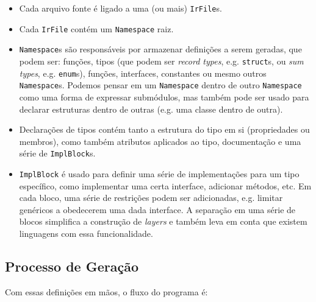 \begin{itemize}
\item Cada arquivo fonte é ligado a uma (ou mais) \texttt{IrFile}s.
\item Cada \texttt{IrFile} contém um \texttt{Namespace} raiz.
\item \texttt{Namespace}s são responsáveis por armazenar definições a serem geradas, que podem ser:
  funções, tipos (que podem ser \textit{record types}, e.g. \texttt{struct}s, ou \textit{sum types},
  e.g. \texttt{enum}s), funções, interfaces, constantes ou mesmo outros \texttt{Namespace}s. Podemos
  pensar em um \texttt{Namespace} dentro de outro \texttt{Namespace} como uma forma de expressar
  submódulos, mas também pode ser usado para declarar estruturas dentro de outras (e.g. uma classe
  dentro de outra).
\item Declarações de tipos contém tanto a estrutura do tipo em si (propriedades ou membros), como
  também atributos aplicados ao tipo, documentação e uma série de \texttt{ImplBlock}s.
\item \texttt{ImplBlock} é usado para definir uma série de implementações para um tipo específico,
  como implementar uma certa interface, adicionar métodos, etc. Em cada bloco, uma série de restrições
  podem ser adicionadas, e.g. limitar genéricos a obedecerem uma dada interface. A separação em
  uma série de blocos simplifica a construção de \textit{layers} e também leva em conta que
  existem linguagens com essa funcionalidade.
\end{itemize}


\subsection{Processo de Geração}

Com essas definições em mãos, o fluxo do programa é:

